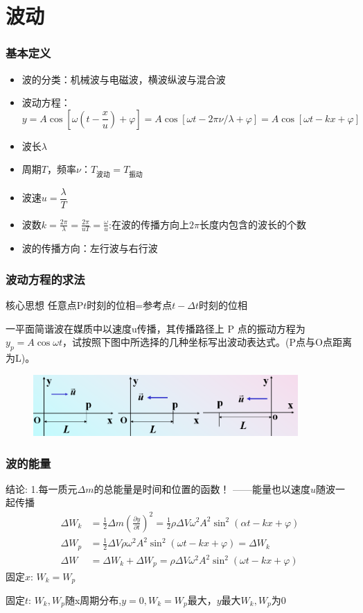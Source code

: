 \documentclass[UTF8]{ctexbeamer}
\begin{document}
\section{波动}
\begin{frame}[t]
\frametitle{基本定义}
\begin{itemize}
	\item 波的分类：机械波与电磁波，横波纵波与混合波
	\item 波动方程：
	$$y=A\cos[\omega(t-\frac xu)+\varphi]=A\cos[\omega t-2\pi \nu/\lambda+\varphi]=A\cos[\omega t-kx+\varphi]$$
	\item 波长$\lambda$
	\item 周期$T$，频率$\nu$：$T_{\text{波动}}=T_{\text{振动}}$
	\item 波速$u=\dfrac{\lambda}{T}$
	\item 波数$k=\frac{2\pi}\lambda=\frac{2\pi}{uT}=\frac\omega u$:在波的传播方向上$2\pi$长度内包含的波长的个数
	\item 波的传播方向：左行波与右行波
\end{itemize}
\end{frame}

\begin{frame}[t]
\frametitle{波动方程的求法}
\begin{block}{核心思想}
	任意点P$t$时刻的位相=参考点$t-\Delta t$时刻的位相	
\end{block}
\begin{examples}
	一平面简谐波在媒质中以速度u传播，其传播路径上 P 点的振动方程为$y_p=A\cos\omega t$，试按照下图中所选择的几种坐标写出波动表达式。(P点与O点距离为L)。	
\end{examples}
\begin{figure}[!ht]
	\centering
	\includegraphics[width=0.9\textwidth]{1}
\end{figure}

\end{frame}



\begin{frame}
\frametitle{波的能量}
结论:
1.每一质元$\Delta m$的总能量是时间和位置的函数！
	——能量也以速度$u$随波一起传播
	\begin{align*}
		\Delta W_k&=\frac12\Delta m(\frac{\partial y}{\partial t})^2=\frac12\rho\Delta V\omega^2A^2\sin^2(\alpha t-kx+\varphi)\\
		{\Delta W}_{p}&=\frac12\Delta V\rho\omega^2A^2\sin^2(\omega t-kx+\varphi)=\Delta W_k\\
		\Delta W&=\Delta W_{k}+\Delta W_{p}=\rho\Delta V\omega^{2}A^{2}\sin^{2}(\omega t-kx+\varphi)
	\end{align*}
	固定$x$:	$W_k= W_p$
	
	固定$t$: $W_k,W_p$随x周期分布,$y = 0,W_k= W_p$最大，$y$最大$W_k,W_p$为0
\end{frame}
\end{document}
